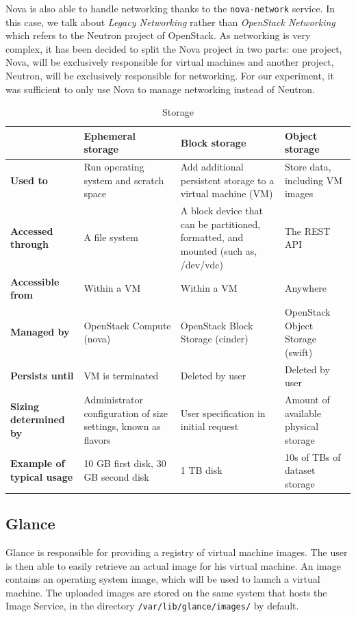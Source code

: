 Nova is also able to handle networking thanks to the \texttt{nova-network} service. 
In this case, we talk about \textit{Legacy Networking} rather than \textit{OpenStack Networking} which refers to the Neutron project of OpenStack. 
As networking is very complex, it has been decided to split the Nova project in two parts: one project, Nova, will be exclusively responsible for virtual machines and another project, Neutron, will be exclusively responsible for networking. 
For our experiment, it was sufficient to only use Nova to manage networking instead of Neutron.


\begin{table}[h]
	\centering
	\begin{tabular}{|m{2cm}|m{3.8cm}|m{3.8cm}|m{3.8cm}|}
		\hline
		 & 
		\textbf{Ephemeral \newline storage} & 
		\textbf{Block storage} & 
		\textbf{Object storage}\\
		\hline
		\textbf{Used to} & 
		Run operating system and scratch space & 
		Add additional persistent storage to a virtual machine (VM) & 
		Store data, including VM images \\
		\hline
		\textbf{Accessed through} & 
		A file system & 
		A block device that can be partitioned, formatted, and mounted (such as, /dev/vdc) & 
		The REST API \\
		\hline
		\textbf{Accessible from} & 
		Within a VM & 
		Within a VM & 
		Anywhere \\
		\hline
		\textbf{Managed by} & 
		OpenStack Compute (nova) & 
		OpenStack Block Storage (cinder) & 
		OpenStack Object Storage (swift) \\
		\hline
		\textbf{Persists until} & 
		VM is terminated & 
		Deleted by user & 
		Deleted by user \\
		\hline
		\textbf{Sizing determined by} & 
		Administrator configuration of size settings, known as flavors & 
		User specification in initial request & 
		Amount of available physical storage \\
		\hline
		\textbf{Example of typical usage} & 
		10 GB first disk, 30 GB second disk & 
		1 TB disk & 
		10s of TBs of dataset storage \\
		\hline
	\end{tabular}
	\caption{Storage \cite{stodec}}
	\label{table:storage_list}
\end{table}


\subsection{Glance}
Glance is responsible for providing a registry of virtual machine images. 
The user is then able to easily retrieve an actual image for his virtual machine. 
An image contains an operating system image, which will be used to launch a virtual machine. 
The uploaded images are stored on the same system that hosts the Image Service, in the directory \texttt{/var/lib/glance/images/} by default.

